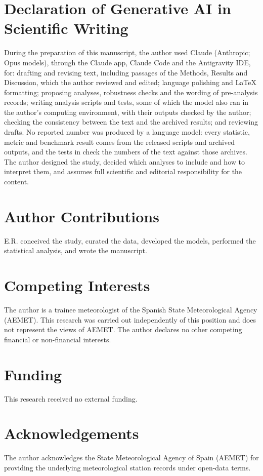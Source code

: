 \documentclass[11pt,a4paper]{article}
\begin{document}
\section*{Declaration of Generative AI in Scientific Writing}
During the preparation of this manuscript, the author used Claude (Anthropic; Opus models), through the Claude app, Claude Code and the Antigravity IDE, for: drafting and revising text, including passages of the Methods, Results and Discussion, which the author reviewed and edited; language polishing and LaTeX formatting; proposing analyses, robustness checks and the wording of pre-analysis records; writing analysis scripts and tests, some of which the model also ran in the author's computing environment, with their outputs checked by the author; checking the consistency between the text and the archived results; and reviewing drafts. No reported number was produced by a language model: every statistic, metric and benchmark result comes from the released scripts and archived outputs, and the tests in  check the numbers of the text against those archives. The author designed the study, decided which analyses to include and how to interpret them, and assumes full scientific and editorial responsibility for the content.

\section*{Author Contributions}
E.R. conceived the study, curated the data, developed the models, performed the statistical analysis, and wrote the manuscript.

\section*{Competing Interests}
The author is a trainee meteorologist of the Spanish State Meteorological Agency (AEMET). This research was carried out independently of this position and does not represent the views of AEMET. The author declares no other competing financial or non-financial interests.

\section*{Funding}
This research received no external funding.

\section*{Acknowledgements}
The author acknowledges the State Meteorological Agency of Spain (AEMET) for providing the underlying meteorological station records under open-data terms.
\end{document}
